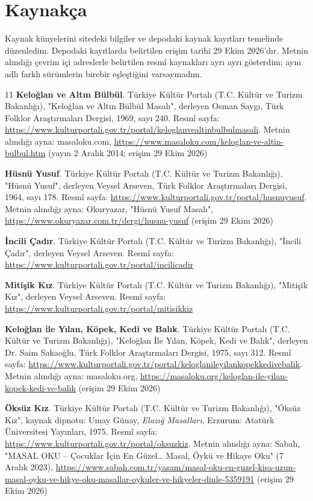 \documentclass[12pt,a4paper]{article}
\begin{document}
\section{Kaynakça}
Kaynak künyelerini sitedeki bilgiler ve depodaki kaynak kayıtları temelinde düzenledim. Depodaki kayıtlarda belirtilen erişim tarihi 29 Ekim 2026'dır. Metnin alındığı çevrim içi adreslerle belirtilen resmî kaynakları ayrı ayrı gösterdim; aynı adlı farklı sürümlerin birebir eşleştiğini varsaymadım.
\begin{thebibliography}{11}
 \textbf{Keloğlan ve Altın Bülbül}. Türkiye Kültür Portalı (T.C. Kültür ve Turizm Bakanlığı), "Keloğlan ve Altın Bülbül Masalı", derleyen Osman Saygı, Türk Folklor Araştırmaları Dergisi, 1969, sayı 240. Resmî sayfa: \url{https://www.kulturportali.gov.tr/portal/keloglanvealtinbulbulmasali}. Metnin alındığı ayna: masaloku.com, \url{https://www.masaloku.com/keloglan-ve-altin-bulbul.htm} (yayın 2 Aralık 2014; erişim 29 Ekim 2026)


 \textbf{Hüsnü Yusuf}. Türkiye Kültür Portalı (T.C. Kültür ve Turizm Bakanlığı), "Hüsnü Yusuf", derleyen Veysel Arseven, Türk Folklor Araştırmaları Dergisi, 1964, sayı 178. Resmî sayfa: \url{https://www.kulturportali.gov.tr/portal/husnuyusuf}. Metnin alındığı ayna: Okuryazar, "Hüsnü Yusuf Masalı", \url{https://www.okuryazar.com.tr/dergi/husnu-yusuf} (erişim 29 Ekim 2026)

 \textbf{İncili Çadır}. Türkiye Kültür Portalı (T.C. Kültür ve Turizm Bakanlığı), "İncili Çadır", derleyen Veysel Arseven. Resmî sayfa: \url{https://www.kulturportali.gov.tr/portal/incilicadir}

 \textbf{Mitişik Kız}. Türkiye Kültür Portalı (T.C. Kültür ve Turizm Bakanlığı), "Mitişik Kız", derleyen Veysel Arseven. Resmî sayfa: \url{https://www.kulturportali.gov.tr/portal/mitisikkiz}

 \textbf{Keloğlan ile Yılan, Köpek, Kedi ve Balık}. Türkiye Kültür Portalı (T.C. Kültür ve Turizm Bakanlığı), "Keloğlan İle Yılan, Köpek, Kedi ve Balık", derleyen Dr. Saim Sakaoğlu, Türk Folklor Araştırmaları Dergisi, 1975, sayı 312. Resmî sayfa: \url{https://www.kulturportali.gov.tr/portal/keloglanileyilankopekkedivebalik}. Metnin alındığı ayna: masaloku.org, \url{https://masaloku.org/keloglan-ile-yilan-kopek-kedi-ve-balik} (erişim 29 Ekim 2026)

 \textbf{Öksüz Kız}. Türkiye Kültür Portalı (T.C. Kültür ve Turizm Bakanlığı), "Öksüz Kız", kaynak dipnotu: Umay Günay, \emph{Elazığ Masalları}, Erzurum: Atatürk Üniversitesi Yayınları, 1975. Resmî sayfa: \url{https://www.kulturportali.gov.tr/portal/oksuzkiz}. Metnin alındığı ayna: Sabah, "MASAL OKU – Çocuklar İçin En Güzel… Masal, Öykü ve Hikaye Oku" (7 Aralık 2023), \url{https://www.sabah.com.tr/yasam/masal-oku-en-guzel-kisa-uzun-masal-oyku-ve-hikye-oku-masallar-oykuler-ve-hikyeler-dinle-5359191} (erişim 29 Ekim 2026)


\end{thebibliography}
\end{document}
